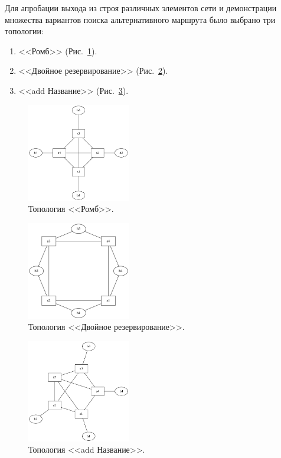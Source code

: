 \documentclass[12pt, a4paper]{article}
\begin{document}
Для апробации выхода из строя различных элементов сети и демонстрации множества вариантов поиска альтернативного маршрута было выбрано три топологии:
\begin{enumerate}
	\item <<Ромб>> (Рис.~\ref{pic:4node}).
	\item <<Двойное резервирование>> (Рис.~\ref{pic:double}).
	\item <<add Название>> (Рис.~\ref{pic:5node}).
\end{enumerate}

\begin{figure}[h!]
	\centering
	\includegraphics[width=0.40\textwidth]{img/4node.png}
	\caption{Топология <<Ромб>>.}
	\label{pic:4node}
\end{figure}

\begin{figure}[h!]
	\centering
	\includegraphics[width=0.40\textwidth]{img/double.png}
	\caption[russian]{Топология <<Двойное резервирование>>.}
	\label{pic:double}
\end{figure}

\begin{figure}[h!]
	\centering
	\includegraphics[width=0.40\textwidth]{img/5node.png}
	\caption{Топология <<add Название>>.}
	\label{pic:5node}
\end{figure}
\end{document}
